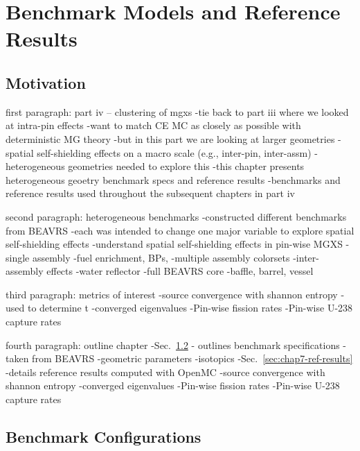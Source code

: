 \chapter{Benchmark Models and Reference Results}
\label{chap:benchmarks}

\section{Motivation}
\label{sec:chap7-motivate}

first paragraph: part iv -- clustering of mgxs
-tie back to part iii where we looked at intra-pin effects
  -want to match CE MC as closely as possible with deterministic MG theory
  -but in this part we are looking at larger geometries
  -spatial self-shielding effects on a macro scale (e.g., inter-pin, inter-assm)
-heterogeneous geometries needed to explore this
  -this chapter presents heterogeneous geoetry benchmark specs and reference results
  -benchmarks and reference results used throughout the subsequent chapters in part iv

second paragraph: heterogeneous benchmarks
-constructed different benchmarks from \ac{BEAVRS}
-each was intended to change one major variable to explore spatial self-shielding effects
  -understand spatial self-shielding effects in pin-wise MGXS
-single assembly
  -fuel enrichment, \ac{BP}s, 
-multiple assembly colorsets
  -inter-assembly effects 
  -water reflector
-full \ac{BEAVRS} core
  -baffle, barrel, vessel

third paragraph: metrics of interest
-source convergence with shannon entropy
  -used to determine t
-converged eigenvalues
-Pin-wise fission rates
-Pin-wise U-238 capture rates

fourth paragraph: outline chapter
-Sec.~\ref{sec:chap7-benchmarks} - outlines benchmark specifications
  -taken from \ac{BEAVRS}
  -geometric parameters
  -isotopics
-Sec.~\ref{sec:chap7-ref-results}
  -details reference results computed with OpenMC
  -source convergence with shannon entropy
  -converged eigenvalues
  -Pin-wise fission rates
  -Pin-wise U-238 capture rates


\section{Benchmark Configurations}
\label{sec:chap7-benchmarks}

